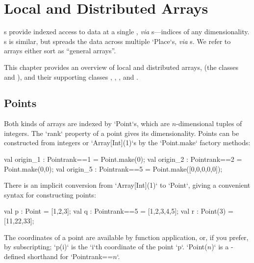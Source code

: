 \chapter{Local and Distributed Arrays}\label{XtenArrays}

s provide indexed access to data at a single , {\em via}
s---indices of any dimensionality. s is similar, but
spreads the data across multiple \xcd`Place`s, {\em via} s.  
We refer to arrays either sort as ``general arrays''.  


This chapter provides an overview of local and distributed arrays, 
(the  classes 
and ), and their supporting classes , 
, 
, 
and .  


\section{Points}\label{point-syntax}


Both kinds of arrays are indexed by \xcd`Point`s, which are $n$-dimensional tuples of
integers.  The \xcd`rank`
property of a point gives its dimensionality.  Points can be constructed from
integers or \xcd`Array[Int](1)`s by
the \xcd`Point.make` factory methods:
\begin{xten}
val origin_1 : Point{rank==1} = Point.make(0);
val origin_2 : Point{rank==2} = Point.make(0,0);
val origin_5 : Point{rank==5} = Point.make([0,0,0,0,0]);
\end{xten}

There is an implicit conversion from \xcd`Array[Int](1)` to 
\xcd`Point`, giving
a convenient syntax for constructing points: 

\begin{xten}
val p : Point = [1,2,3];
val q : Point{rank==5} = [1,2,3,4,5];
val r : Point(3) = [11,22,33];
\end{xten}

The coordinates of a point are available by function application, or, if you
prefer, by subscripting; \xcd`p(i)` is the
\xcd`i`th coordinate of the point \xcd`p`. 
\xcdmath`Point($n$)` is a -defined shorthand  for 
\xcdmath`Point{rank==$n$}`.


